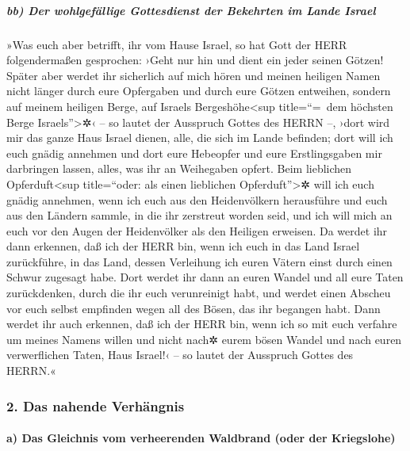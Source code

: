 \hypertarget{bb-der-wohlgefuxe4llige-gottesdienst-der-bekehrten-im-lande-israel}{%
\subparagraph{bb) Der wohlgefällige Gottesdienst der Bekehrten im Lande
Israel}\label{bb-der-wohlgefuxe4llige-gottesdienst-der-bekehrten-im-lande-israel}}

»Was euch aber betrifft, ihr vom Hause Israel, so hat
Gott der HERR folgendermaßen gesprochen: ›Geht nur hin und dient ein
jeder seinen Götzen! Später aber werdet ihr sicherlich auf mich hören
und meinen heiligen Namen nicht länger durch eure Opfergaben und durch
eure Götzen entweihen, sondern auf meinem heiligen Berge,
auf Israels Bergeshöhe\textless sup title=``=~dem höchsten Berge
Israels''\textgreater✲‹ -- so lautet der Ausspruch Gottes des HERRN --,
›dort wird mir das ganze Haus Israel dienen, alle, die sich im Lande
befinden; dort will ich euch gnädig annehmen und dort eure Hebeopfer und
eure Erstlingsgaben mir darbringen lassen, alles, was ihr an Weihegaben
opfert. Beim lieblichen Opferduft\textless sup
title=``oder: als einen lieblichen Opferduft''\textgreater✲ will ich
euch gnädig annehmen, wenn ich euch aus den Heidenvölkern herausführe
und euch aus den Ländern sammle, in die ihr zerstreut worden seid, und
ich will mich an euch vor den Augen der Heidenvölker als den Heiligen
erweisen. Da werdet ihr dann erkennen, daß ich der HERR
bin, wenn ich euch in das Land Israel zurückführe, in das Land, dessen
Verleihung ich euren Vätern einst durch einen Schwur zugesagt habe.
Dort werdet ihr dann an euren Wandel und all eure Taten
zurückdenken, durch die ihr euch verunreinigt habt, und werdet einen
Abscheu vor euch selbst empfinden wegen all des Bösen, das ihr begangen
habt. Dann werdet ihr auch erkennen, daß ich der HERR
bin, wenn ich so mit euch verfahre um meines Namens willen und nicht
nach✲ eurem bösen Wandel und nach euren verwerflichen Taten, Haus
Israel!‹ -- so lautet der Ausspruch Gottes des HERRN.«

\hypertarget{das-nahende-verhuxe4ngnis}{%
\subsubsection{2. Das nahende
Verhängnis}\label{das-nahende-verhuxe4ngnis}}

\hypertarget{a-das-gleichnis-vom-verheerenden-waldbrand-oder-der-kriegslohe}{%
\paragraph{a) Das Gleichnis vom verheerenden Waldbrand (oder der
Kriegslohe)}\label{a-das-gleichnis-vom-verheerenden-waldbrand-oder-der-kriegslohe}}

